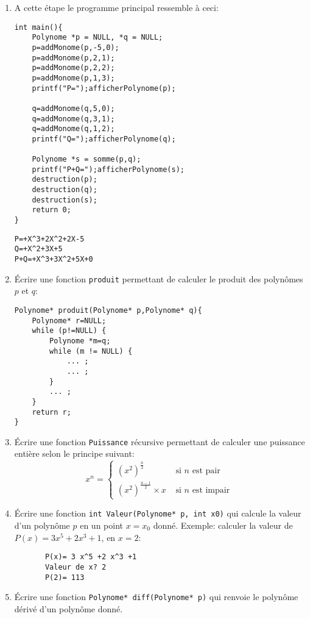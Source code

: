 \documentclass[a4paper]{article}
\begin{document}
\begin{enumerate}
\begin{verbatim}
}
\end{verbatim}
\item A cette étape le programme principal ressemble à ceci:
\begin{verbatim}
int main(){
    Polynome *p = NULL, *q = NULL;
    p=addMonome(p,-5,0);
    p=addMonome(p,2,1);
    p=addMonome(p,2,2);
    p=addMonome(p,1,3);
    printf("P=");afficherPolynome(p);
    
    q=addMonome(q,5,0);
    q=addMonome(q,3,1);
    q=addMonome(q,1,2);
    printf("Q=");afficherPolynome(q);
    
    Polynome *s = somme(p,q);
    printf("P+Q=");afficherPolynome(s);
    destruction(p);
    destruction(q);
    destruction(s);
    return 0;
}
\end{verbatim}
\begin{verbatim}
P=+X^3+2X^2+2X-5
Q=+X^2+3X+5
P+Q=+X^3+3X^2+5X+0
\end{verbatim}
\item Écrire une fonction {\tt produit} permettant de calculer le produit  des polynômes $p$ et $q$:
\begin{verbatim}
Polynome* produit(Polynome* p,Polynome* q){
    Polynome* r=NULL;
    while (p!=NULL) {
        Polynome *m=q;
        while (m != NULL) {
            ... ;
            ... ;
        }
        ... ;
    }
    return r;
}
\end{verbatim}

\item Écrire une fonction {\tt Puissance} récursive permettant de calculer une puissance entière selon le principe suivant:
\[x^n=\left\{\begin{array}{ll}
\left(x^2\right)^{\frac n2} &\mbox{ si } n \mbox{ est pair }\\
\left(x^2\right)^{\frac {n-1}2} \times x &\mbox{ si } n \mbox{ est impair }
\end{array}\right.
\]

\item Écrire une fonction {\tt int Valeur(Polynome* p, int x0)} qui calcule la valeur d'un polynôme $p$ en un point $x=x_0$ donné. Exemple: calculer la valeur de  $P(x)=3x^5+2x^3+1$, en $x=2$:
\begin{verbatim}
	   P(x)= 3 x^5 +2 x^3 +1
	   Valeur de x? 2
	   P(2)= 113 
\end{verbatim}
\item Écrire une fonction {\tt Polynome* diff(Polynome* p)} qui renvoie le polynôme dérivé d'un polynôme donné.


\end{enumerate}
\end{document}
